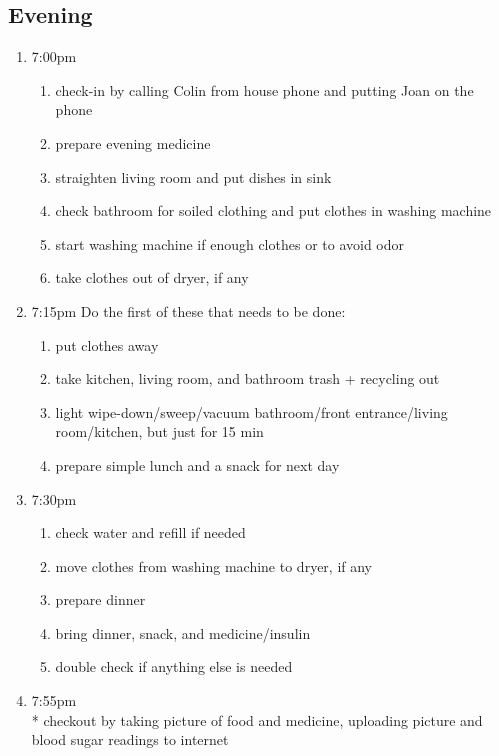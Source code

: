 \documentclass[12pt,letterpaper]{article}
\begin{document}
\begin{multicols}{2}
	\subsection*{Evening}
	\begin{enumerate}
		\item 7:00pm
			\begin{enumerate}
				\item check-in by calling Colin from house phone and putting Joan on the phone
				\item prepare evening medicine
				\item straighten living room and put dishes in sink
				\item check bathroom for soiled clothing and put clothes in washing machine
				\item start washing machine if enough clothes or to avoid odor
				\item take clothes out of dryer, if any
			\end{enumerate}
		\item 7:15pm
			Do the first of these that needs to be done:
			\begin{enumerate}
				\item put clothes away
				\item take kitchen, living room, and bathroom trash + recycling out
				\item light wipe-down/sweep/vacuum bathroom/front entrance/living room/kitchen, but just for 15 min
				\item prepare simple lunch and a snack for next day
			\end{enumerate}
		\item 7:30pm
			\begin{enumerate}
				\item check water and refill if needed
				\item move clothes from washing machine to dryer, if any
				\item prepare dinner
				\item bring dinner, snack, and medicine/insulin
				\item double check if anything else is needed
			\end{enumerate}
		\item 7:55pm \\*
			checkout by taking picture of food and medicine, uploading picture and blood sugar readings to internet
	\end{enumerate}

\end{multicols}
\end{document}
